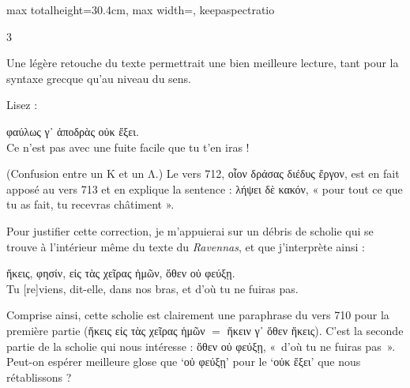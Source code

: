 \documentclass[11pt,twoside]{book}
\newcommand{\currHeadLE}{}
\newcommand{\currHeadRE}{}
\newcommand{\currHeadLO}{}
\newcommand{\currHeadRO}{}
\newcommand{\italique}[1]{\textit{#1}}
\newcommand{\citComm}[1]{\begin{quoting}[vskip=0.4pt,leftmargin=0.7em,rightmargin=0.2em]#1\end{quoting}}
\newcommand{\R}{\textbf{R}}
\newcommand{\francais}[1]{{\policeFr #1}}
\begin{document}
\begin{adjustbox}{max totalheight=30.4cm, max width=\textwidth, keepaspectratio}
\begin{minipage}{\textwidth}
{\begin{multicols}{3}
\par\vspace{1.5pt}
\noindent Une légère retouche du texte permettrait une bien meilleure lecture, tant pour la syntaxe grecque qu'au niveau du sens.
\par\vspace{1.5pt}
\noindent Lisez :
\citComm{φαύλως γ᾽ ἀποδρὰς οὐκ ἔξει.\\
\francais{Ce n'est pas avec une fuite facile que tu t'en iras !}}
\par\vspace{1.5pt}
\noindent (Confusion entre un Κ et un Λ.) Le vers 712, οἷον δράσας διέδυς ἔργον, est en fait apposé au vers 713 et en explique la sentence : λήψει δὲ κακόν, « pour tout ce que tu as fait, tu recevras châtiment ».
\par\vspace{1.5pt}
\noindent Pour justifier cette correction, je m'appuierai sur un débris de scholie qui se trouve à l'intérieur même du texte du \italique{Ravennas}, et que j'interprète ainsi :
\citComm{ἥκεις, φησίν, εἰς τὰς χεῖρας ἡμῶν, ὅθεν οὐ φεύξῃ.\\
Tu [re]viens, dit-elle, dans nos bras, et d'où tu ne fuiras pas.}
\par\vspace{1.5pt}
\noindent Comprise ainsi, cette scholie est clairement une paraphrase du vers 710 pour la première partie (ἥκεις εἰς τὰς χεῖρας ἡμῶν $=$ ἥκειν γ᾽ ὅθεν ἥκεις). C'est la seconde partie de la scholie qui nous intéresse : ὅθεν οὐ φεύξῃ, «~d'où tu ne fuiras pas~». Peut-on espérer meilleure glose que `οὐ φεύξῃ' pour le `οὐκ ἔξει' que nous rétablissons ?
\par\end{multicols}}
\end{minipage}\end{adjustbox}
\clearpage\ifodd\value{page}\hbox{}\newpage\fi
\renewcommand{\currHeadLE}{ΑΡΙΣΤΟΦΑΝΟΥΣ ΘΕΣΜΟΦΟΡΙΑΖΟΥΣΑΙ · CODEX RAVENNAS 429 (\R)}
\renewcommand{\currHeadRE}{Folio f. 171r (Classense 173r) · vv. 721–764}
\renewcommand{\currHeadLO}{FAC-SIMILÉ DU CODEX RAVENNAS 429 (\R) · f. 171r (Classense 173r)}
\renewcommand{\currHeadRO}{vv. 721–764 · Planche recadrée sur la zone écrite et harmonisée}
\end{document}
